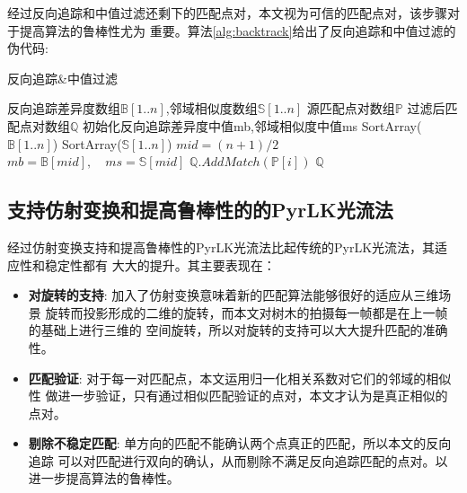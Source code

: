 经过反向追踪和中值过滤还剩下的匹配点对，本文视为可信的匹配点对，该步骤对于提高算法的鲁棒性尤为
重要。算法\ref{alg:backtrack}给出了反向追踪和中值过滤的伪代码:\\
\begin{algorithm}[H]
	\caption{反向追踪\&中值过滤}
	\label{alg:backtrack}
	\begin{algorithmic}[1]
	\Require 反向追踪差异度数组$\mathbb{B}[1..n]$,邻域相似度数组$\mathbb{S}[1..n]$
	\Require 源匹配点对数组$\mathbb{P}$
	\Ensure 过滤后匹配点对数组$\mathbb{Q}$
	\State 初始化反向追踪差异度中值mb,邻域相似度中值ms
	\State SortArray($\mathbb{B}[1..n]$)
	\State SortArray($\mathbb{S}[1..n]$)
	\State $mid=(n+1)/2$
	\State $mb=\mathbb{B}[mid],\quad ms=\mathbb{S}[mid]$
		\State $\mathbb{Q}.AddMatch(\mathbb{P}[i])$
	\EndIf
	\EndFor
	\State \Return $\mathbb{Q}$
	\end{algorithmic}
\end{algorithm}

\subsection{支持仿射变换和提高鲁棒性的的PyrLK光流法}
经过仿射变换支持和提高鲁棒性的PyrLK光流法比起传统的PyrLK光流法，其适应性和稳定性都有
大大的提升。其主要表现在：\\
\begin{itemize}
	\item \textbf{对旋转的支持}: 加入了仿射变换意味着新的匹配算法能够很好的适应从三维场景
		旋转而投影形成的二维的旋转，而本文对树木的拍摄每一帧都是在上一帧的基础上进行三维的
		空间旋转，所以对旋转的支持可以大大提升匹配的准确性。
	\item \textbf{匹配验证}: 对于每一对匹配点，本文运用归一化相关系数对它们的邻域的相似性
		做进一步验证，只有通过相似匹配验证的点对，本文才认为是真正相似的点对。
	\item \textbf{剔除不稳定匹配}: 单方向的匹配不能确认两个点真正的匹配，所以本文的反向追踪
		可以对匹配进行双向的确认，从而剔除不满足反向追踪匹配的点对。以进一步提高算法的鲁棒性。
\end{itemize}

